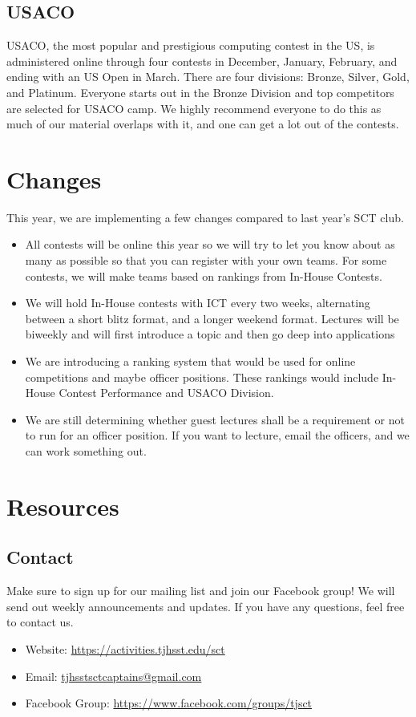 \documentclass[11pt]{article}
\begin{document}
\subsection{USACO}
    USACO, the most popular and prestigious computing contest in the US, is administered online through four contests in December, January, February, and ending with an US Open in March. There are four divisions: Bronze, Silver, Gold, and Platinum. Everyone starts out in the Bronze Division and top competitors are selected for USACO camp. We highly recommend everyone to do this as much of our material overlaps with it, and one can get a lot out of the contests.  

\section{Changes}
    This year, we are implementing a few changes compared to last year's SCT club. 
    
\begin{itemize}

    \item All contests will be online this year so we will try to let you know about as many as possible so that you can register with your own teams. For some contests, we will make teams based on rankings from In-House Contests.
    \item We will hold In-House contests with ICT every two weeks, alternating between a short blitz format, and a longer weekend format. Lectures will be biweekly and will first introduce a topic and then go deep into applications
    \item We are introducing a ranking system that would be used for online competitions and maybe officer positions. These rankings would include In-House Contest Performance and USACO Division.
    \item We are still determining whether guest lectures shall be a requirement or not to run for an officer position. If you want to lecture, email the officers, and we can work something out.
\end{itemize}


\section{Resources}
\subsection{Contact}
    Make sure to sign up for our mailing list and join our Facebook group! We will send out weekly announcements and updates. If you have any questions, feel free to contact us.
\begin{itemize}
  \item Website: \url{https://activities.tjhsst.edu/sct}
  \item Email: \href{mailto:tjhsstsctcaptains@gmail.com}{tjhsstsctcaptains@gmail.com}
  \item Facebook Group: \url{https://www.facebook.com/groups/tjsct}
\end{itemize}
\end{document}
